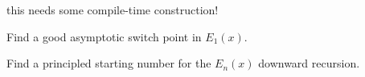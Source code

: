 
\begin{DoxyRefList}
\item[\label{todo__todo000001}%
\hypertarget{todo__todo000001}{}%
Member \hyperlink{namespacestd_1_1____detail_a3fe9fa143beb1a5d9f8ca18b3783f650}{std\+:\+:\+\_\+\+\_\+detail\+:\+:\+\_\+\+\_\+dawson\+\_\+const\+\_\+frac} (\+\_\+\+Tp \+\_\+\+\_\+x)]this needs some compile-\/time construction!  
\item[\label{todo__todo000003}%
\hypertarget{todo__todo000003}{}%
Member \hyperlink{namespacestd_1_1____detail_a665eb0c524b929c035d88bbb17815917}{std\+:\+:\+\_\+\+\_\+detail\+:\+:\+\_\+\+\_\+expint\+\_\+\+E1} (\+\_\+\+Tp \+\_\+\+\_\+x)]Find a good asymptotic switch point in $ E_1(x) $.  
\item[\label{todo__todo000002}%
\hypertarget{todo__todo000002}{}%
Member \hyperlink{namespacestd_1_1____detail_a9b0a2050324390fb6c4a584170289a99}{std\+:\+:\+\_\+\+\_\+detail\+:\+:\+\_\+\+\_\+expint\+\_\+\+En\+\_\+recursion} (unsigned int \+\_\+\+\_\+n, \+\_\+\+Tp \+\_\+\+\_\+x)]Find a principled starting number for the $ E_n(x) $ downward recursion. 
\end{DoxyRefList}